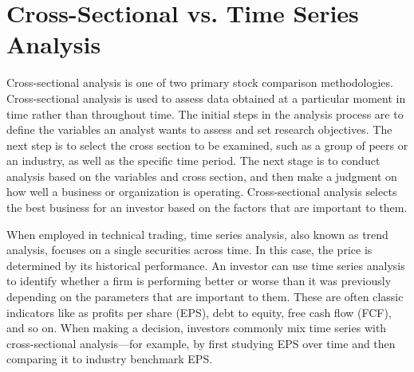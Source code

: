 \section{Cross-Sectional vs. Time Series Analysis} %
\label{sec:intro_sum_results} %
Cross-sectional analysis is one of two primary stock comparison methodologies. Cross-sectional analysis is used to assess data obtained at a particular moment in time rather than throughout time. The initial steps in the analysis process are to define the variables an analyst wants to assess and set research objectives. The next step is to select the cross section to be examined, such as a group of peers or an industry, as well as the specific time period. The next stage is to conduct analysis based on the variables and cross section, and then make a judgment on how well a business or organization is operating. Cross-sectional analysis selects the best business for an investor based on the factors that are important to them.

When employed in technical trading, time series analysis, also known as trend analysis, focuses on a single securities across time. In this case, the price is determined by its historical performance. An investor can use time series analysis to identify whether a firm is performing better or worse than it was previously depending on the parameters that are important to them. These are often classic indicators like as profits per share (EPS), debt to equity, free cash flow (FCF), and so on. When making a decision, investors commonly mix time series with cross-sectional analysis—for example, by first studying EPS over time and then comparing it to industry benchmark EPS.
